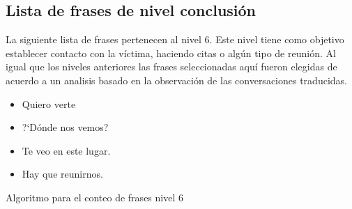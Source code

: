 \subsection{Lista de frases de nivel conclusi\'on}
La siguiente lista de frases pertenecen al nivel 6. Este nivel tiene como objetivo establecer contacto con la v\'ictima, haciendo citas o alg\'un tipo de reuni\'on. Al igual que los niveles anteriores las frases seleccionadas aqu\'i fueron elegidas de acuerdo a un analisis basado en la observaci\'on de las conversaciones traducidas.


\begin{itemize}
\item Quiero verte
\item ?`D\'onde nos vemos?
\item Te veo en este lugar.
\item Hay que reunirnos.
\end{itemize}


\begin{algorithm}
\BlankLine
{}
\caption{Algoritmo para el conteo de frases nivel 6}
\end{algorithm}\DecMargin{1em}
							
